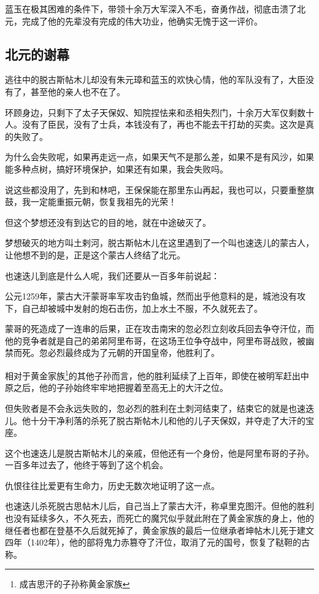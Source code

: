 \begin{multicols}{\theparacolNo}
		蓝玉在极其困难的条件下，带领十余万大军深入不毛，奋勇作战，彻底击溃了北元，完成了他的先辈没有完成的伟大功业，他确实无愧于这一评价。

		\subsection{北元的谢幕}
		逃往中的脱古斯帖木儿却没有朱元璋和蓝玉的欢快心情，他的军队没有了，大臣没有了，甚至他的亲人也不在了。

		环顾身边，只剩下了太子天保奴、知院捏怯来和丞相失烈门，十余万大军仅剩数十人。没有了臣民，没有了士兵，本钱没有了，再也不能去干打劫的买卖。这次是真的失败了。

		为什么会失败呢，如果再走远一点，如果天气不是那么差，如果不是有风沙，如果能多种点树，搞好环境保护，如果还有如果，我会失败吗。

		说这些都没用了，先到和林吧，王保保能在那里东山再起，我也可以，只要重整旗鼓，我一定能重振元朝，恢复我祖先的光荣！

		但这个梦想还没有到达它的目的地，就在中途破灭了。

		梦想破灭的地方叫土剌河，脱古斯帖木儿在这里遇到了一个叫也速迭儿的蒙古人，让他想不到的是，正是这个蒙古人终结了北元。

		也速迭儿到底是什么人呢，我们还要从一百多年前说起：

		公元1259年，蒙古大汗蒙哥率军攻击钓鱼城，然而出乎他意料的是，城池没有攻下，自己却被城中发射的炮石击伤，加上水土不服，不久就死去了。

		蒙哥的死造成了一连串的后果，正在攻击南宋的忽必烈立刻收兵回去争夺汗位，而他的竞争者就是自己的弟弟阿里布哥，在这场王位争夺战中，阿里布哥战败，被幽禁而死。忽必烈最终成为了元朝的开国皇帝，他胜利了。

		相对于黄金家族\footnote{成吉思汗的子孙称黄金家族}的其他子孙而言，他的胜利延续了上百年，即使在被明军赶出中原之后，他的子孙始终牢牢地把握着至高无上的大汗之位。

		但失败者是不会永远失败的，忽必烈的胜利在土刺河结束了，结束它的就是也速迭儿。他十分干净利落的杀死了脱古斯帖木儿和他的儿子天保奴，并夺走了大汗的宝座。

		这个也速迭儿是脱古斯帖木儿的亲戚，但他还有一个身份，他是阿里布哥的子孙。一百多年过去了，他终于等到了这个机会。

		仇恨往往比爱更有生命力，历史无数次地证明了这一点。

		也速迭儿杀死脱古思帖木儿后，自己当上了蒙古大汗，称卓里克图汗。但他的胜利也没有延续多久，不久死去，而死亡的魔咒似乎就此附在了黄金家族的身上，他的继任者也都在登基不久后就死掉了，黄金家族的最后一位继承者坤帖木儿死于建文四年（1402年），他的部将鬼力赤篡夺了汗位，取消了元的国号，恢复了鞑靼的古称。


\end{multicols}
